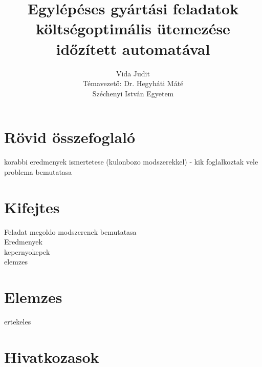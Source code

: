 \documentclass {report}
\begin{document}
\title{Egylépéses gyártási feladatok költségoptimális ütemezése időzített automatával}

\author{Vida Judit\\Témavezető: Dr. Hegyháti Máté\\Széchenyi István Egyetem}
\maketitle


\tableofcontents
\chapter{R\"ovid \"osszefoglal\'o}
korabbi eredmenyek ismertetese (kulonbozo modszerekkel) - kik foglalkoztak vele\\ problema bemutatasa

\chapter{Kifejtes}
Feladat megoldo modszerenek bemutatasa\\
Eredmenyek\\
kepernyokepek\\
elemzes\\

\chapter{Elemzes}
ertekeles

\chapter{Hivatkozasok}
\end{document}

